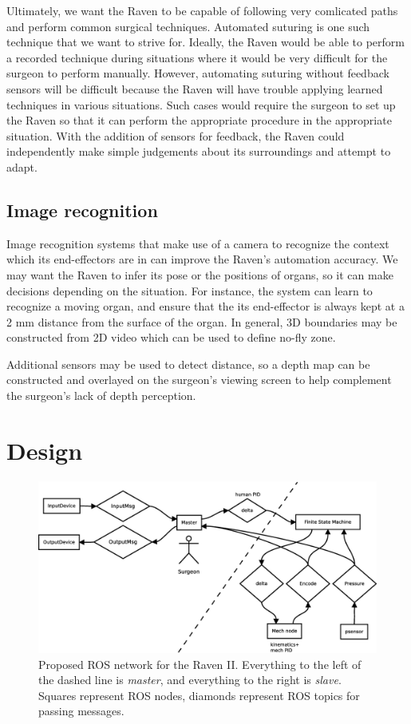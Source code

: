 \documentclass[letterpaper,twocolumn,10pt]{article}
\begin{document}
Ultimately, we want the Raven to be capable of following very 
comlicated paths and perform common surgical techniques. Automated 
suturing is one such technique that we want to strive for. Ideally, 
the Raven would be able to perform a recorded technique  
during situations where it would be very difficult 
for the surgeon to perform manually. However, automating suturing 
without feedback sensors will be difficult because the Raven will 
have trouble applying learned techniques in various situations. 
Such cases would require the surgeon to set up the Raven so that it can 
perform the appropriate procedure in the appropriate situation. With 
the addition of sensors for feedback, the Raven could independently make 
simple judgements about its surroundings and attempt to adapt.

\subsection{Image recognition}
Image recognition systems that make use of a camera to recognize the
context which its end-effectors are in can improve the Raven's
automation accuracy. We may want the Raven to infer its pose or the
positions of organs, so it can make decisions depending on the
situation. For instance, the system can learn to recognize a moving
organ, and ensure that the its end-effector is always kept at a 2 mm
distance from the surface of the organ. In general, 3D boundaries may
be constructed from 2D video which can be used to define no-fly zone.

Additional sensors may be used to detect distance, so a depth map
can be constructed and overlayed on the surgeon's viewing screen to
help complement the surgeon's lack of depth perception.

\section{Design}

\begin{figure}[t]
  \begin{center}
    \includegraphics[width=1.0\textwidth]{ros_high_level_v2.eps}
  \end{center}
  \caption{Proposed ROS network for the Raven II. Everything to the
    left of the dashed line is \emph{master}, and everything to the
    right is \emph{slave}. Squares represent ROS nodes, diamonds
    represent ROS topics for passing messages.}
  \label{fig:ros_network}
\end{figure}
\end{document}
